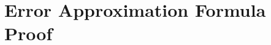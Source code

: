 \documentclass[12pt]{article}
\begin{document}


\label{sec:conc}






%
\newpage

\clearpage
\appendix


\section{Error Approximation Formula Proof}
\label{sec:error-bound-formula}
\end{document}
